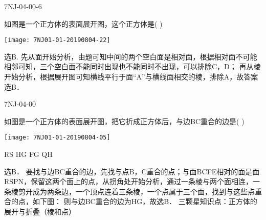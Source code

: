 \begin{defproblem}{7NJ-04-00-6}%
\begin{onlyproblem}%
如图是一个正方体的表面展开图，这个正方体是(    ) 
\begin{center}
\texttt{[image: 7NJ01-01-20190804-22]}
\end{center}


\end{onlyproblem}%
\begin{onlysolution}%
\begin{solution}%
选B. 
先从面开始分析，由题可知中间的两个空白面是相对面，根据相对面不可能相邻可知，三个空白面不能同时出现也不能同时不出现，可以排除C，D； 再从棱开始分析，根据展开图可知横线平行于面“A”与横线面相交的棱，排除A，故答案选B． 
\end{solution}%
\end{onlysolution}%
\end{defproblem}



\begin{defproblem}{7NJ-04-00}%
\begin{onlyproblem}%
如图是一个正方体的表面展开图，把它折成正方体后，与边BC重合的边是(    ) 
\begin{center}
\texttt{[image: 7NJ01-01-20190804-05]}
\end{center}
\xx
{RS}
{HG}
{FG}
{QH}
\end{onlyproblem}%
\begin{onlysolution}%
\begin{solution}%
选B．
要找与边BC重合的边，先找与点B，C重合的点；与面BCFE相对的面是面RSPN，保留这两个面上的点，从拐角处开始分析，通过一条棱与两个面相连，一条棱剪开成为两条边，一个顶点连着三条棱，一个点属于三个面，找到与这些点重合的点，如下图：   则与边BC重合的边为HG，故选B． 
三颗星知识点：正方体的展开与折叠（棱和点）  
\end{solution}%
\end{onlysolution}%
\end{defproblem}



